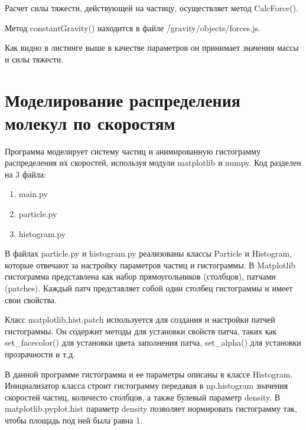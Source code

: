 \noindent Расчет силы тяжести, действующей на частицу, осуществляет метод CalcForce().


\noindent Метод constantGravity() находится в файле /gravity/objects/forces.js.

\noindent Как видно в листинге выше в качестве параметров он принимает значения массы и силы тяжести.

\newpage
\section{Моделирование распределения молекул по скоростям}

Программа моделирует систему частиц и анимированную гистограмму распределения их скоростей, используя модули matplotlib и numpy. Код разделен на 3 файла:

\begin{enumerate}
    \item main.py
    \item particle.py
    \item histogram.py
\end{enumerate}

В файлах particle.py и histogram.py реализованы классы Particle и Histogram, которые отвечают за настройку параметров частиц и гистограммы. В Matplotlib гистограмма представлена как набор прямоугольников (столбцов), патчами (patches). Каждый патч представляет собой один столбец гистограммы и имеет свои свойства.

Класс matplotlib.hist.patch используется для создания и настройки патчей гистограммы. Он содержит методы для установки свойств патча, таких как set\_facecolor() для установки цвета заполнения патча, set\_alpha() для установки прозрачности и т.д.

В данной программе гистограмма и ее параметры описаны в классе Histogram. Инициализатор класса строит гистограмму передавая в  np.histogram значения скоростей частиц, количесто столбцов,  а также булевый параметр density. В matplotlib.pyplot.hist параметр
density позволяет нормировать гистограмму так, чтобы площадь под ней была равна 1.

